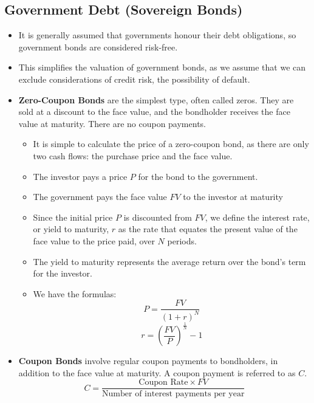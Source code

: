 \subsection*{Government Debt (Sovereign Bonds)}
\begin{itemize}
    \item It is generally assumed that governments honour their debt obligations, so government bonds are considered risk-free.
    \item This simplifies the valuation of government bonds, as we assume that we can exclude considerations of credit risk, the possibility of default.
    \item \textbf{Zero-Coupon Bonds} are the simplest type, often called zeros. They are sold at a discount to the face value, and the bondholder receives the face value at maturity. There are no coupon payments.
    \begin{itemize}
        \item It is simple to calculate the price of a zero-coupon bond, as there are only two cash flows: the purchase price and the face value.
        \item The investor pays a price $P$ for the bond to the government.
        \item The government pays the face value $FV$ to the investor at maturity
        \item Since the initial price $P$ is discounted from $FV$, we define the interest rate, or yield to maturity, $r$ as the rate that equates the present value of the face value to the price paid, over $N$ periods.
        \item The yield to maturity represents the average return over the bond's term for the investor.
        \item We have the formulas:
        \begin{equation}
               P = \frac{FV}{(1 + r)^N}
              \end{equation}
        \begin{equation}
                r = \left(\frac{FV}{P}\right)^{\frac{1}{N}} - 1
        \end{equation}
    \end{itemize}
    \item \textbf{Coupon Bonds} involve regular coupon payments to bondholders, in addition to the face value at maturity. A coupon payment is referred to as $C$. 
    \begin{equation}
        C = \frac{\text{Coupon Rate} \times FV}{\text{Number of interest payments per year}}

\end{equation}
\end{itemize}
